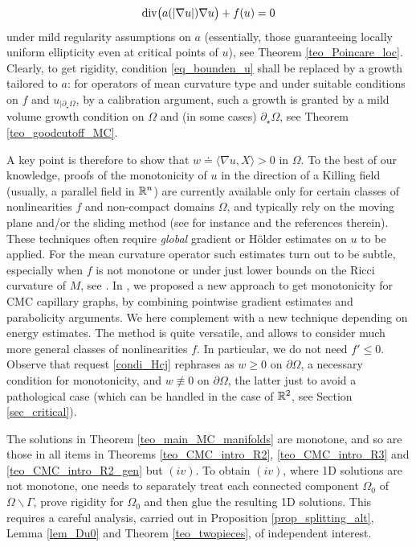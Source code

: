 \documentclass[10 pt,a4paper]{article}
\theoremstyle{definition}
\begin{document}
\begin{equation}\label{eq_alapla_gen}
\mathrm{div} \big( a(|\nabla u|)\nabla u \big) +f(u) = 0
\end{equation}
under mild regularity assumptions on $a$ (essentially, those guaranteeing locally uniform ellipticity even at critical points of $u$), see Theorem \ref{teo_Poincare_loc}. Clearly, to get rigidity, condition \eqref{eq_bounden_u} shall be replaced by a growth tailored to $a$: for operators of mean curvature type and under suitable conditions on $f$ and $u_{|\partial_\star \Omega}$, by a calibration argument,  such a growth is granted by a mild volume growth condition on $\Omega$ and (in some cases) $\partial_\star \Omega$, see Theorem \ref{teo_goodcutoff_MC}.

A key point is therefore to show that $w \doteq \langle \nabla u, X \rangle > 0$ in $\Omega$. To the best of our knowledge, proofs of the monotonicity of $u$ in the direction of a Killing field (usually, a parallel field in $\mathbb R^n$) are currently available only for certain classes of nonlinearities $f$ and non-compact domains $\Omega$, and typically rely on the moving plane and/or the sliding method (see for instance \cite{bcn,FarMarVal} and the references therein). These techniques often require  \emph{global} gradient or H\"older estimates on $u$ to be applied. For the mean curvature operator such estimates turn out to be subtle, especially when $f$ is not monotone or under just lower bounds on the Ricci curvature of $M$, see \cite{cmmr,cmr}. In \cite{cmr}, we proposed a new approach to get monotonicity for CMC capillary graphs, by combining pointwise gradient estimates and parabolicity arguments. We here complement \cite{cmr} with a new technique depending on energy estimates.
The method is quite versatile, and allows to consider much more general classes of nonlinearities $f$. In particular, we do not  need $f' \le 0$. Observe that request \eqref{condi_Hcj} rephrases as $w \ge 0$ on $\partial \Omega$, a necessary condition for monotonicity, and $w \not\equiv 0$ on $\partial \Omega$, the latter just to avoid a pathological case (which can be handled in the case of $\mathbb R^2$, see Section \ref{sec_critical}).

The solutions in Theorem \ref{teo_main_MC_manifolds} are monotone, and so are those in all items in Theorems \ref{teo_CMC_intro_R2}, \ref{teo_CMC_intro_R3} and \ref{teo_CMC_intro_R2_gen} but $(iv)$. To obtain $(iv)$, where 1D solutions are not monotone, one needs to separately treat each connected component $\Omega_0$ of $\Omega \backslash \Gamma$, prove rigidity for $\Omega_0$ and then glue the resulting 1D solutions. This requires a careful analysis, carried out in Proposition \ref{prop_splitting_alt}, Lemma \ref{lem_Du0} and Theorem \ref{teo_twopieces}, of independent interest.
\end{document}
